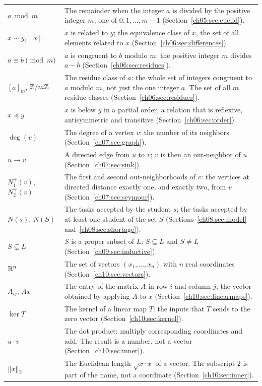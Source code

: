 \begin{longtable}{@{}p{1.25in}p{3.95in}@{}}
$a\bmod m$ & The remainder when the integer $a$ is divided by the positive integer $m$; one of $0,1,\ldots,m-1$ (Section~\ref{ch05:sec:euclid}).\\
$x\sim y$, $[x]$ & $x$ is related to $y$; the equivalence class of $x$, the set of all elements related to $x$ (Section~\ref{ch06:sec:differences}).\\
$a\equiv b\pmod m$ & $a$ is congruent to $b$ modulo $m$: the positive integer $m$ divides $a-b$ (Section~\ref{ch06:sec:residues}).\\
$[a]_m$, $\mathbb Z/m\mathbb Z$ & The residue class of $a$: the whole set of integers congruent to $a$ modulo $m$, not just the one integer $a$. The set of all $m$ residue classes (Section~\ref{ch06:sec:residues}).\\
$x\preceq y$ & $x$ is below $y$ in a partial order, a relation that is reflexive, antisymmetric and transitive (Section~\ref{ch06:sec:order}).\\
$\deg(v)$ & The degree of a vertex $v$: the number of its neighbors (Section~\ref{ch07:sec:graph}).\\
$u\to v$ & A directed edge from $u$ to $v$; $v$ is then an out-neighbor of $u$ (Section~\ref{ch07:sec:sink}).\\
$N_1^+(v)$, $N_2^+(v)$ & The first and second out-neighborhoods of $v$: the vertices at directed distance exactly one, and exactly two, from $v$ (Section~\ref{ch07:sec:seymour}).\\
$N(s)$, $N(S)$ & The tasks accepted by the student $s$; the tasks accepted by at least one student of the set $S$ (Sections~\ref{ch08:sec:model} and~\ref{ch08:sec:shortage}).\\
$S\subsetneq L$ & $S$ is a proper subset of $L$: $S\subseteq L$ and $S\ne L$ (Section~\ref{ch09:sec:inductive}).\\
$\mathbb R^n$ & The set of vectors $(x_1,\ldots,x_n)$ with $n$ real coordinates (Section~\ref{ch10:sec:vectors}).\\
$A_{ij}$, $Ax$ & The entry of the matrix $A$ in row $i$ and column $j$; the vector obtained by applying $A$ to $x$ (Section~\ref{ch10:sec:linearmaps}).\\
$\ker T$ & The kernel of a linear map $T$: the inputs that $T$ sends to the zero vector (Section~\ref{ch10:sec:kernel}).\\
$u\cdot v$ & The dot product: multiply corresponding coordinates and add. The result is a number, not a vector (Section~\ref{ch10:sec:inner}).\\
$\left\|x\right\|_2$ & The Euclidean length $\sqrt{x\cdot x}$ of a vector. The subscript $2$ is part of the name, not a coordinate (Section~\ref{ch10:sec:inner}).\\

\end{longtable}
